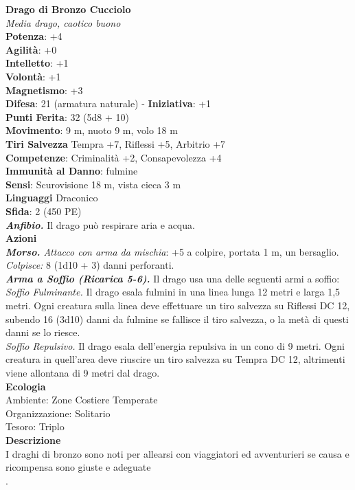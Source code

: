 \begin{multicols}{2}
\medskip\textbf{Drago di Bronzo Cucciolo}\\
\emph{Media drago, caotico buono}\\
\textbf{Potenza}: +4\\
\textbf{Agilità}: +0\\
\textbf{Intelletto}: +1\\
\textbf{Volontà}: +1\\
\textbf{Magnetismo}: +3\\
\textbf{Difesa}: 21 (armatura naturale) - \textbf{Iniziativa}: +1\\
\textbf{Punti Ferita}: 32 (5d8 + 10)\\
\textbf{Movimento}: 9 m, nuoto 9 m, volo 18 m\\
\textbf{Tiri Salvezza} Tempra +7, Riflessi +5, Arbitrio +7\\
\textbf{Competenze}: Criminalità +2, Consapevolezza +4\\
\textbf{Immunità al Danno}: fulmine\\
\textbf{Sensi}: Scurovisione 18 m, vista cieca 3 m\\
\textbf{Linguaggi} Draconico\\
\textbf{Sfida}: 2 (450 PE)\smallskip\\
\emph{\textbf{Anfibio.}} Il drago può respirare aria e acqua.\\
\smallskip\textbf{Azioni}\\
\emph{\textbf{Morso.} Attacco con arma da mischia}: +5 a colpire, portata 1 m, un bersaglio.\\
\emph{Colpisce:} 8 (1d10 + 3) danni perforanti.\\
\emph{\textbf{Arma a Soffio (Ricarica 5-6).}} Il drago usa una delle seguenti armi a soffio:\\
\emph{Soffio Fulminante.} Il drago esala fulmini in una linea lunga 12 metri e larga 1,5 metri. Ogni creatura sulla linea deve effettuare un tiro salvezza su Riflessi DC 12, subendo 16 (3d10) danni da fulmine se fallisce il tiro salvezza, o la metà di questi danni se lo riesce.\\
\emph{Soffio Repulsivo.} Il drago esala dell'energia repulsiva in un cono di 9 metri. Ogni creatura in quell'area deve riuscire un tiro salvezza su Tempra DC 12, altrimenti viene allontana di 9 metri dal drago.\\
\textbf{Ecologia}\\
Ambiente: Zone Costiere Temperate\\
Organizzazione: Solitario\\
Tesoro: Triplo\\
\textbf{Descrizione}\\
I draghi di bronzo sono noti per allearsi con viaggiatori ed avventurieri se causa e ricompensa sono giuste e adeguate\\
.


\end{multicols}

